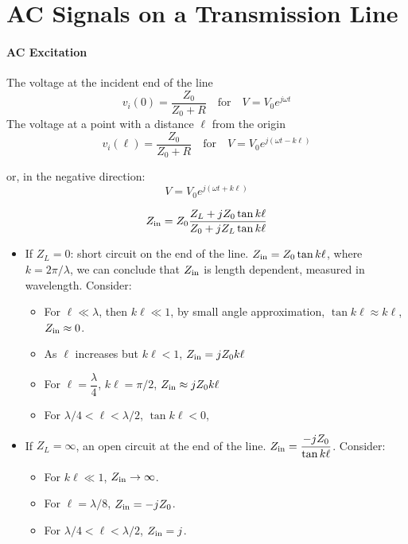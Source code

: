 \documentclass[12pt,a4paper]{article}
\begin{document}
\section{AC Signals on a Transmission Line}
\paragraph{AC Excitation}
The voltage at the incident end of the line 
\[
    v_i (0) = \frac{Z_0}{Z_0 + R} \quad \text{for} \quad V = V_0 e^{j \omega t}
\]
The voltage at a point with a distance $\ell$ from the origin
\[
    v_i (\ell) = \frac{Z_0}{Z_0 + R} \quad \text{for} \quad V = V_0 e^{j (\omega t-k \ell)}
\]

or, in the negative direction:
\[
    V = V_0 e^{j (\omega t+k \ell)}
\]

\[
    Z_{\rm in} = Z_0 \frac{Z_L + j Z_0 \tan k \ell}{Z_0 + j Z_L \tan k \ell}
\]

\begin{itemize}
    \item If $Z_L = 0$: short circuit on the end of the line. $Z_{\rm in} = Z_0 \tan k \ell$, where $k = 2 \pi / \lambda$, we can conclude that $Z_{\rm in}$ is length dependent, measured in wavelength. Consider:
    
    \begin{itemize}
        \item For $\ell \ll \lambda$, then $k \ell \ll 1$, by small angle approximation, $\tan k \ell \approx k \ell$, $Z_{\rm in} \approx 0$.

        \item As $\ell$ increases but $k \ell < 1$, $Z_{\rm in} = j Z_0 k \ell$

        \item For $\ell = \dfrac{\lambda}{4}$, $k \ell = \pi/2$, $Z_{\rm in} \approx j Z_0 k \ell$

        \item For $\lambda/4 < \ell < \lambda/2$, $\tan k\ell < 0$,
    \end{itemize}

    \item If $Z_L = \infty$, an open circuit at the end of the line. $Z_{\rm in} = \dfrac{-j Z_0}{\tan k \ell}$. Consider:
    \begin{itemize}
        \item For $k \ell \ll 1$, $Z_{\rm in} \to \infty$.

        \item For $\ell = \lambda /8$, $Z_{\rm in} = -j Z_0$.

        \item For $\lambda/4 < \ell < \lambda/2$, $Z_{\rm in} = j$.
    \end{itemize}
    
\end{itemize}
\end{document}
